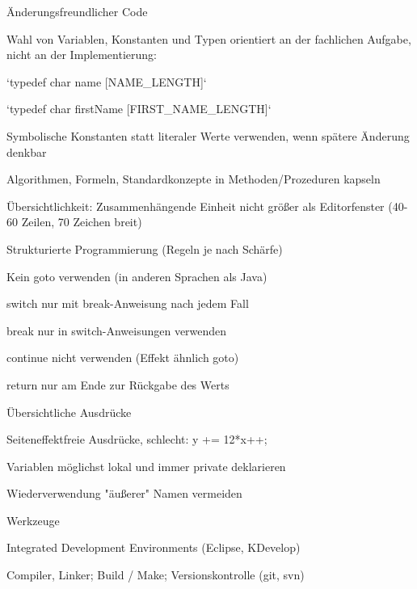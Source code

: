 \documentclass[a4paper]{article}
\begin{document}
\begin{multicols}{3}
  Änderungsfreundlicher Code
  \begin{itemize*}
    \item Wahl von Variablen, Konstanten und Typen orientiert an der fachlichen Aufgabe, nicht an der Implementierung:
          \begin{itemize*}
            \item `typedef char name [NAME\_LENGTH]`
            \item `typedef char firstName [FIRST\_NAME\_LENGTH]`
          \end{itemize*}
    \item Symbolische Konstanten statt literaler Werte verwenden, wenn spätere Änderung denkbar
    \item Algorithmen, Formeln, Standardkonzepte in Methoden/Prozeduren kapseln
    \item Übersichtlichkeit: Zusammenhängende Einheit nicht größer als Editorfenster (40-60 Zeilen, 70 Zeichen breit)
    \item Strukturierte Programmierung (Regeln je nach Schärfe)
          \begin{itemize*}
            \item Kein goto verwenden (in anderen Sprachen als Java)
            \item switch nur mit break-Anweisung nach jedem Fall
            \item break nur in switch-Anweisungen verwenden
            \item continue nicht verwenden (Effekt ähnlich goto)
            \item return nur am Ende zur Rückgabe des Werts
          \end{itemize*}
    \item Übersichtliche Ausdrücke
          \begin{itemize*}
            \item Seiteneffektfreie Ausdrücke, schlecht: y += 12*x++;
          \end{itemize*}
    \item Variablen möglichst lokal und immer private deklarieren
    \item Wiederverwendung "äußerer" Namen vermeiden
  \end{itemize*}

  Werkzeuge
  \begin{itemize*}
    \item Integrated Development Environments (Eclipse, KDevelop)
    \item Compiler, Linker; Build / Make; Versionskontrolle (git, svn)
  \end{itemize*}


\end{multicols}
\end{document}

